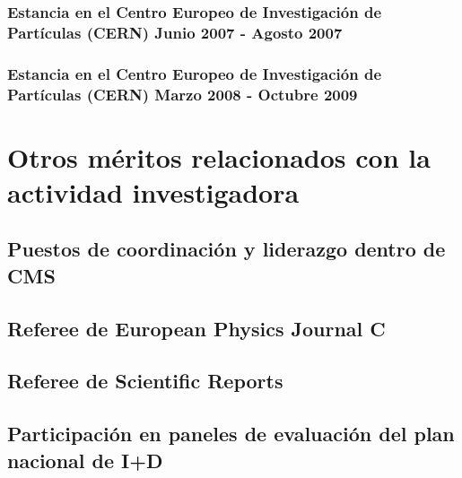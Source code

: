 \documentclass[a4paper, 11pt, twoside, openright]{report}
\begin{document}
\subsubsection{Estancia en el Centro Europeo de Investigación de Partículas (CERN) Junio 2007 - Agosto 2007}



\subsubsection{Estancia en el Centro Europeo de Investigación de Partículas (CERN) Marzo 2008 - Octubre 2009}



\section{Otros méritos relacionados con la actividad investigadora}

\subsection{Puestos de coordinación y liderazgo dentro de CMS}



\subsection{Referee de European Physics Journal C}



\subsection{Referee de Scientific Reports}


\subsection{Participación en paneles de evaluación del plan nacional de I+D}

\end{document}
